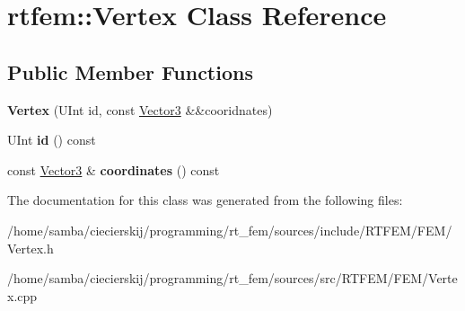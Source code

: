 \hypertarget{classrtfem_1_1Vertex}{}\section{rtfem\+:\+:Vertex Class Reference}
\label{classrtfem_1_1Vertex}
\subsection*{Public Member Functions}
\begin{DoxyCompactItemize}
\item 
\mbox{\label{classrtfem_1_1Vertex_af617944ad95bfed3c365658b4f6206b6}} 
{\bfseries Vertex} (U\+Int id, const \hyperlink{structrtfem_1_1Vector3}{Vector3} \&\&cooridnates)
\item 
\mbox{\label{classrtfem_1_1Vertex_a31414c1e1a737f47142462a79861b46c}} 
U\+Int {\bfseries id} () const
\item 
\mbox{\label{classrtfem_1_1Vertex_a5275104d2d988c1eb4f8796782a0010b}} 
const \hyperlink{structrtfem_1_1Vector3}{Vector3} \& {\bfseries coordinates} () const
\end{DoxyCompactItemize}


The documentation for this class was generated from the following files\+:\begin{DoxyCompactItemize}
\item 
/home/samba/ciecierskij/programming/rt\+\_\+fem/sources/include/\+R\+T\+F\+E\+M/\+F\+E\+M/Vertex.\+h\item 
/home/samba/ciecierskij/programming/rt\+\_\+fem/sources/src/\+R\+T\+F\+E\+M/\+F\+E\+M/Vertex.\+cpp\end{DoxyCompactItemize}
